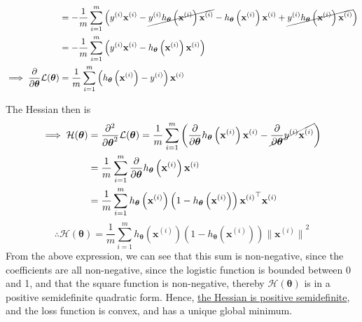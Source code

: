 \begin{align*}
     & =
    -\frac{1}{m} \sum_{i=1}^{m}
    \Big(
    y^{(i)} \mathbf{x}^{(i)}
    -
    \cancel{y^{(i)} h_{\boldsymbol{\theta}}\left(\mathbf{x}^{(i)}\right) \mathbf{x}^{(i)}}
    -
    h_{\boldsymbol{\theta}}\left(\mathbf{x}^{(i)}\right) \mathbf{x}^{(i)}
    +
    \cancel{y^{(i)} h_{\boldsymbol{\theta}}\left(\mathbf{x}^{(i)}\right) \mathbf{x}^{(i)}}
    \Big)
    \\ & =
    -\frac{1}{m} \sum_{i=1}^{m}
    \left(
    y^{(i)} \mathbf{x}^{(i)}
    -
    h_{\boldsymbol{\theta}}\left(\mathbf{x}^{(i)}\right) \mathbf{x}^{(i)}
    \right)
    \\
    \implies
    \frac{\partial}{\partial \boldsymbol{\theta}} \mathcal{L}(\boldsymbol{\theta})
     & =
    \frac{1}{m} \sum_{i=1}^{m}
    \left(
    h_{\boldsymbol{\theta}}\left(\mathbf{x}^{(i)}\right)
    -
    y^{(i)}
    \right)
    \mathbf{x}^{(i)}
\end{align*}

The Hessian then is
\begin{align*}
    \implies
    \mathcal{H}(\boldsymbol{\theta})
     & =
    \frac{\partial^2}{\partial \boldsymbol{\theta}^2} \mathcal{L}(\boldsymbol{\theta})
    =
    \frac{1}{m} \sum_{i=1}^{m}
    \left(
    \frac{\partial}{\partial \boldsymbol{\theta}} h_{\boldsymbol{\theta}}\left(\mathbf{x}^{(i)}\right) \mathbf{x}^{(i)}
    -
    \cancel{\frac{\partial}{\partial \boldsymbol{\theta}} y^{(i)} \mathbf{x}^{(i)}}
    \right)
    \\ & =
    \frac{1}{m} \sum_{i=1}^{m}
    \frac{\partial}{\partial \boldsymbol{\theta}} h_{\boldsymbol{\theta}}\left(\mathbf{x}^{(i)}\right) \mathbf{x}^{(i)}
    \\ & =
    \frac{1}{m} \sum_{i=1}^{m}
    h_{\boldsymbol{\theta}}\left(\mathbf{x}^{(i)}\right) \left(1-h_{\boldsymbol{\theta}}\left(\mathbf{x}^{(i)}\right)\right) {\mathbf{x}^{(i)}}^\top \mathbf{x}^{(i)}
\end{align*}
\begin{equation*}
    \therefore
    \boxed{
        \mathcal{H}(\boldsymbol{\theta})
        =
        \frac{1}{m} \sum_{i=1}^{m}
        h_{\boldsymbol{\theta}}\left(\mathbf{x}^{(i)}\right) \left(1-h_{\boldsymbol{\theta}}\left(\mathbf{x}^{(i)}\right)\right)
        {\lVert \mathbf{x}^{(i)} \rVert}^2
    }
\end{equation*}
From the above expression, we can see that this sum is non-negative, since the coefficients are all non-negative, since the logistic function is bounded between 0 and 1, and that the square function is non-negative, thereby \( \mathcal{H}(\boldsymbol{\theta}) \) is in a positive semidefinite quadratic form.
Hence, \underline{the Hessian is positive semidefinite}, and the loss function is convex, and has a unique global minimum.

